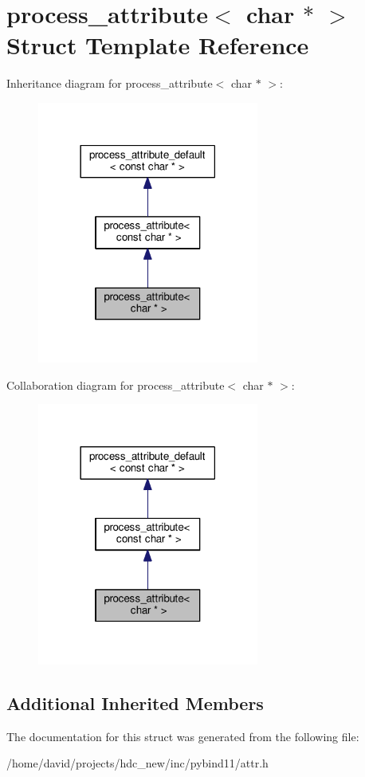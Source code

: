 \hypertarget{structprocess__attribute_3_01char_01_5_01_4}{}\section{process\+\_\+attribute$<$ char $\ast$ $>$ Struct Template Reference}
\label{structprocess__attribute_3_01char_01_5_01_4}


Inheritance diagram for process\+\_\+attribute$<$ char $\ast$ $>$\+:
\nopagebreak
\begin{figure}[H]
\begin{center}
\leavevmode
\includegraphics[width=206pt]{structprocess__attribute_3_01char_01_5_01_4__inherit__graph}
\end{center}
\end{figure}


Collaboration diagram for process\+\_\+attribute$<$ char $\ast$ $>$\+:
\nopagebreak
\begin{figure}[H]
\begin{center}
\leavevmode
\includegraphics[width=206pt]{structprocess__attribute_3_01char_01_5_01_4__coll__graph}
\end{center}
\end{figure}
\subsection*{Additional Inherited Members}


The documentation for this struct was generated from the following file\+:\begin{DoxyCompactItemize}
\item 
/home/david/projects/hdc\+\_\+new/inc/pybind11/attr.\+h\end{DoxyCompactItemize}
